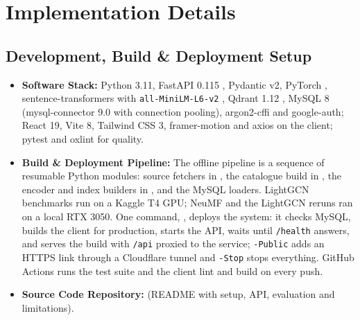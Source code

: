 \documentclass[11pt, a4paper]{article}
\begin{document}
\section{Implementation Details}

\subsection{Development, Build \& Deployment Setup}
\begin{itemize}[noitemsep, topsep=2pt]
    \item \textbf{Software Stack:} Python 3.11, FastAPI 0.115 \cite{fastapi}, Pydantic v2, PyTorch \cite{pytorch}, sentence-transformers with \texttt{all-MiniLM-L6-v2} \cite{reimers2019sbert,sbertminilm}, Qdrant 1.12 \cite{qdrant}, MySQL 8 (mysql-connector 9.0 with connection pooling), argon2-cffi and google-auth; React 19, Vite 8, Tailwind CSS 3, framer-motion and axios on the client; pytest and oxlint for quality.
    \item \textbf{Build \& Deployment Pipeline:} The offline pipeline is a sequence of resumable Python modules: source fetchers in , the catalogue build in , the encoder and index builders in , and the MySQL loaders. LightGCN benchmarks run on a Kaggle T4 GPU; NeuMF and the LightGCN reruns ran on a local RTX 3050. One command, , deploys the system: it checks MySQL, builds the client for production, starts the API, waits until \texttt{/health} answers, and serves the build with \texttt{/api} proxied to the service; \texttt{-Public} adds an HTTPS link through a Cloudflare tunnel and \texttt{-Stop} stops everything. GitHub Actions runs the test suite and the client lint and build on every push.
    \item \textbf{Source Code Repository:} (README with setup, API, evaluation and limitations).
\end{itemize}
\end{document}
